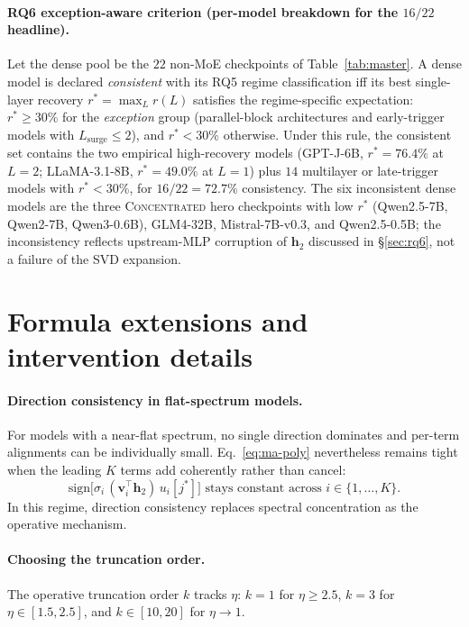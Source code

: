 \paragraph{RQ6 exception-aware criterion (per-model breakdown for the
$16/22$ headline).}
Let the dense pool be the $22$ non-MoE checkpoints of
Table~\ref{tab:master}. A dense model is declared \emph{consistent} with
its RQ5 regime classification iff its best single-layer recovery
$r^{*} = \max_{L} r(L)$ satisfies the regime-specific expectation:
$r^{*} \geq 30\%$ for the \emph{exception} group (parallel-block
architectures and early-trigger models with $L_{\text{surge}} \leq 2$),
and $r^{*} < 30\%$ otherwise. Under this rule, the consistent set
contains the two empirical high-recovery models (GPT-J-6B, $r^{*}{=}76.4\%$
at $L{=}2$; LLaMA-3.1-8B, $r^{*}{=}49.0\%$ at $L{=}1$) plus $14$ multilayer
or late-trigger models with $r^{*} < 30\%$, for $16/22 = 72.7\%$
consistency. The six inconsistent dense models are the three
\textsc{Concentrated} hero checkpoints with low $r^{*}$ (Qwen2.5-7B,
Qwen2-7B, Qwen3-0.6B), GLM4-32B, Mistral-7B-v0.3, and Qwen2.5-0.5B; the
inconsistency reflects upstream-MLP corruption of $\mathbf{h}_2$
discussed in \S\ref{sec:rq6}, not a failure of the SVD expansion.

\section{Formula extensions and intervention details}
\label{app:formula-extensions}

\paragraph{Direction consistency in flat-spectrum models.}
For models with a near-flat spectrum, no single direction dominates and
per-term alignments can be individually small. Eq.~\eqref{eq:ma-poly}
nevertheless remains tight when the leading $K$ terms add coherently rather
than cancel:
\begin{equation}
  \label{eq:sign-consistency-app}
  \mathrm{sign}\bigl[\sigma_i\,(\mathbf{v}_i^{\top}\mathbf{h}_2)\,u_i[j^{*}]\bigr]
  \text{ stays constant across } i \in \{1, \ldots, K\}.
\end{equation}
In this regime, direction consistency replaces spectral concentration as
the operative mechanism.

\paragraph{Choosing the truncation order.}
The operative truncation order $k$ tracks $\eta$:
$k = 1$ for $\eta \geq 2.5$,
$k = 3$ for $\eta \in [1.5, 2.5]$, and
$k \in [10, 20]$ for $\eta \to 1$.

